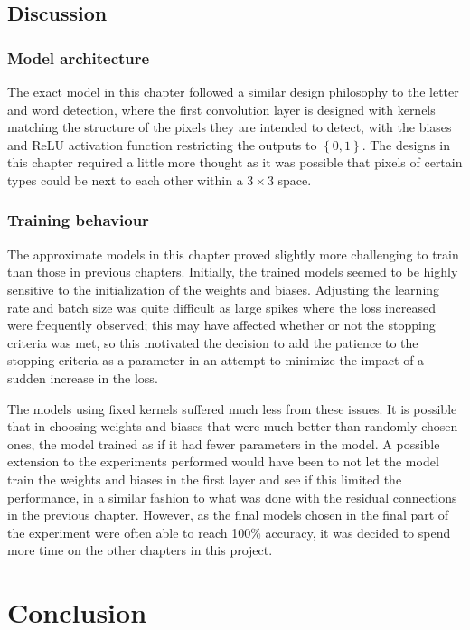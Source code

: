 \documentclass{somasmsc}
\begin{document}
\section{Discussion}

\subsection{Model architecture}

The exact model in this chapter followed a similar design philosophy to the letter and word detection, where the first convolution layer is designed with kernels matching the structure of the pixels they are intended to detect, with the biases and ReLU activation function restricting the outputs to $\left\{0,1\right\}$. The designs in this chapter required a little more thought as it was possible that pixels of certain types could be next to each other within a $3 \times 3$ space.

\subsection{Training behaviour}

The approximate models in this chapter proved slightly more challenging to train than those in previous chapters. Initially, the trained models seemed to be highly sensitive to the initialization of the weights and biases. Adjusting the learning rate and batch size was quite difficult as large spikes where the loss increased were frequently observed; this may have affected whether or not the stopping criteria was met, so this motivated the decision to add the patience to the stopping criteria as a parameter in an attempt to minimize the impact of a sudden increase in the loss.

The models using fixed kernels suffered much less from these issues. It is possible that in choosing weights and biases that were much better than randomly chosen ones, the model trained as if it had fewer parameters in the model. A possible extension to the experiments performed would have been to not let the model train the weights and biases in the first layer and see if this limited the performance, in a similar fashion to what was done with the residual connections in the previous chapter. However, as the final models chosen in the final part of the experiment were often able to reach 100\% accuracy, it was decided to spend more time on the other chapters in this project.


\chapter{Conclusion}
\end{document}
